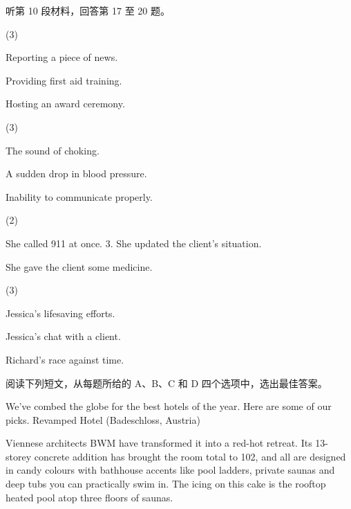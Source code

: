 \documentclass{英语试卷}
\begin{document}
\par 听第 10 段材料，回答第 17 至 20 题。\par
{}
\begin{choices}(3)
  \item Reporting a piece of news.
  \item Providing first aid training.
  \item Hosting an award ceremony.
\end{choices}
\begin{choices}(3)
  \item The sound of choking.
  \item A sudden drop in blood pressure.
  \item Inability to communicate properly.
\end{choices}
\begin{choices}(2)
  \item She called 911 at once. 3. She updated the client's situation.
  \item She gave the client some medicine.
\end{choices}
\begin{choices}(3)
  \item Jessica's lifesaving efforts.
  \item Jessica's chat with a client.
  \item Richard's race against time.
\end{choices}
\par 阅读下列短文，从每题所给的 A、B、C 和 D 四个选项中，选出最佳答案。\par
{}
\par We've combed the globe for the best hotels of the year. Here are some of our picks. Revamped Hotel (Badeschloss, Austria)\par
\par Viennese architects BWM have transformed it into a red-hot retreat. Its 13-storey concrete addition has brought the room total to 102, and all are designed in candy colours with bathhouse accents like pool ladders, private saunas and deep tubs you can practically swim in. The icing on this cake is the rooftop heated pool atop three floors of saunas.\par
\end{document}
